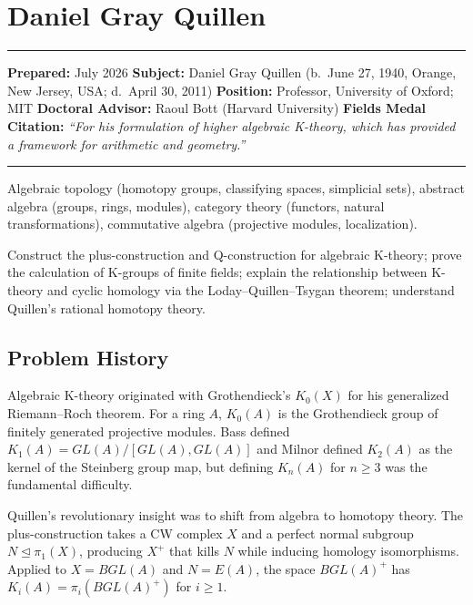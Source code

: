 \chapter{Daniel Gray Quillen}\label{ch1978danielg.quillen:daniel-gray-quillen-fields-medal-1978-a-comprehensive-report-on-his-work-and-impact}

\begin{center}\rule{0.5\linewidth}{0.5pt}\end{center}

\textbf{Prepared:} July 2026 \textbf{Subject:} Daniel Gray Quillen (b.\
June 27, 1940, Orange, New Jersey, USA; d.~April 30, 2011)
\textbf{Position:} Professor, University of Oxford; MIT
\textbf{Doctoral Advisor:} Raoul Bott (Harvard University)
\textbf{Fields Medal Citation:} \emph{``For his formulation of higher
algebraic K-theory, which has provided a framework for arithmetic and
geometry.''}

\begin{center}\rule{0.5\linewidth}{0.5pt}\end{center}

\begin{prereqs} Algebraic topology (homotopy groups, classifying spaces,
simplicial sets), abstract algebra (groups, rings, modules), category
theory (functors, natural transformations), commutative algebra
(projective modules, localization). \end{prereqs}

\begin{objectives} Construct the plus-construction and Q-construction
for algebraic K-theory; prove the calculation of K-groups of finite
fields; explain the relationship between K-theory and cyclic homology
via the Loday--Quillen--Tsygan theorem; understand Quillen's rational
homotopy theory.
\end{objectives}

\section{Problem History}

Algebraic K-theory originated with Grothendieck's $K_0(X)$ for his
generalized Riemann--Roch theorem. For a ring $A$, $K_0(A)$ is the
Grothendieck group of finitely generated projective modules. Bass
defined $K_1(A) = GL(A)/[GL(A),GL(A)]$ and Milnor defined $K_2(A)$ as
the kernel of the Steinberg group map, but defining $K_n(A)$ for
$n \ge 3$ was the fundamental difficulty.

Quillen's revolutionary insight \cite{quillen1973} was to shift from algebra to homotopy
theory. The plus-construction takes a CW complex $X$ and a perfect
normal subgroup $N \unlhd \pi_1(X)$, producing $X^+$ that kills $N$
while inducing homology isomorphisms. Applied to $X = BGL(A)$ and
$N = E(A)$, the space $BGL(A)^+$ has
$K_i(A) = \pi_i(BGL(A)^+)$ for $i \ge 1$.

